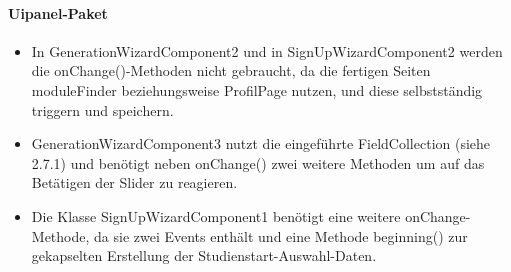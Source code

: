 \paragraph{Uipanel-Paket} 
\begin{itemize}
\item In GenerationWizardComponent2 und in SignUpWizardComponent2 werden die onChange()-Methoden nicht gebraucht, da die fertigen Seiten moduleFinder beziehungsweise ProfilPage nutzen, und diese selbstständig triggern und speichern. 
\item GenerationWizardComponent3 nutzt die eingeführte FieldCollection (siehe 2.7.1) und benötigt neben onChange() zwei weitere Methoden um auf das Betätigen der Slider zu reagieren.
\item Die Klasse SignUpWizardComponent1 benötigt eine weitere onChange-Methode, da sie zwei Events enthält und eine Methode beginning() zur gekapselten Erstellung der Studienstart-Auswahl-Daten.
\end{itemize}